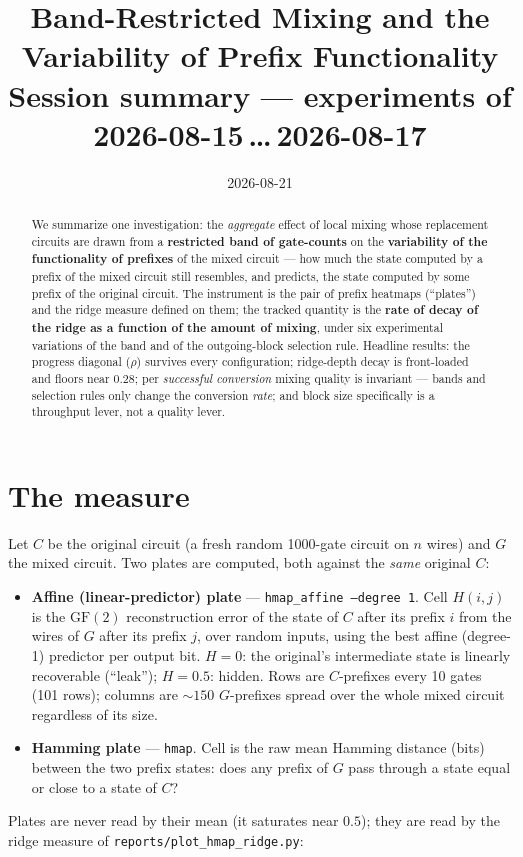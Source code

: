 \documentclass[11pt]{article}
\title{Band-Restricted Mixing and the Variability of Prefix Functionality\\
\large Session summary --- experiments of 2026-08-15\,\ldots\,2026-08-17}
\date{2026-08-21}
\author{}
\newcommand{\code}[1]{\texttt{#1}}
\begin{document}
\maketitle
\vspace{-2.5em}

\begin{abstract}
We summarize one investigation: the \emph{aggregate} effect of local mixing whose replacement circuits
are drawn from a \textbf{restricted band of gate-counts} on the \textbf{variability of the
functionality of prefixes} of the mixed circuit --- how much the state computed by a prefix of the
mixed circuit still resembles, and predicts, the state computed by some prefix of the original circuit.
The instrument is the pair of prefix heatmaps (``plates'') and the ridge measure defined on them; the
tracked quantity is the \textbf{rate of decay of the ridge as a function of the amount of mixing},
under six experimental variations of the band and of the outgoing-block selection rule. Headline
results: the progress diagonal ($\rho$) survives every configuration; ridge-depth decay is
front-loaded and floors near $0.28$; per \emph{successful conversion} mixing quality is invariant ---
bands and selection rules only change the conversion \emph{rate}; and block size specifically is a
throughput lever, not a quality lever.
\end{abstract}

\section{The measure}
Let $C$ be the original circuit (a fresh random 1000-gate circuit on $n$ wires) and $G$ the mixed
circuit. Two plates are computed, both against the \emph{same} original $C$:
\begin{itemize}
\item \textbf{Affine (linear-predictor) plate} — \code{hmap\_affine --degree 1}. Cell $H(i,j)$ is the
$\mathrm{GF}(2)$ reconstruction error of the state of $C$ after its prefix $i$ from the wires of $G$
after its prefix $j$, over random inputs, using the best affine (degree-1) predictor per output bit.
$H=0$: the original's intermediate state is linearly recoverable (``leak''); $H=0.5$: hidden. Rows are
$C$-prefixes every 10 gates (101 rows); columns are ${\sim}150$ $G$-prefixes spread over the whole
mixed circuit regardless of its size.
\item \textbf{Hamming plate} — \code{hmap}. Cell is the raw mean Hamming distance (bits) between the
two prefix states: does any prefix of $G$ pass through a state equal or close to a state of $C$?
\end{itemize}
Plates are never read by their mean (it saturates near $0.5$); they are read by the ridge measure of
\code{reports/plot\_hmap\_ridge.py}:
\end{document}

